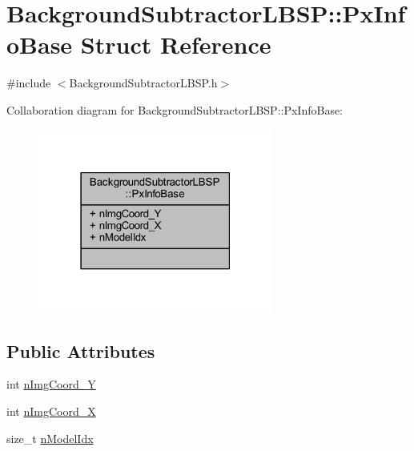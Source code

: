 \hypertarget{struct_background_subtractor_l_b_s_p_1_1_px_info_base}{}\section{Background\+Subtractor\+L\+B\+SP\+:\+:Px\+Info\+Base Struct Reference}
\label{struct_background_subtractor_l_b_s_p_1_1_px_info_base}


{\ttfamily \#include $<$Background\+Subtractor\+L\+B\+S\+P.\+h$>$}



Collaboration diagram for Background\+Subtractor\+L\+B\+SP\+:\+:Px\+Info\+Base\+:\nopagebreak
\begin{figure}[H]
\begin{center}
\leavevmode
\includegraphics[width=219pt]{struct_background_subtractor_l_b_s_p_1_1_px_info_base__coll__graph}
\end{center}
\end{figure}
\subsection*{Public Attributes}
\begin{DoxyCompactItemize}
\item 
int \mbox{\hyperlink{struct_background_subtractor_l_b_s_p_1_1_px_info_base_a42cb6eecda647b2a11b90ea420f2bc31}{n\+Img\+Coord\+\_\+Y}}
\item 
int \mbox{\hyperlink{struct_background_subtractor_l_b_s_p_1_1_px_info_base_a10966fe72f000045adede9e853156b48}{n\+Img\+Coord\+\_\+X}}
\item 
size\+\_\+t \mbox{\hyperlink{struct_background_subtractor_l_b_s_p_1_1_px_info_base_afe4a63a708fa0f3ea6ed2fac837bc71d}{n\+Model\+Idx}}
\end{DoxyCompactItemize}


